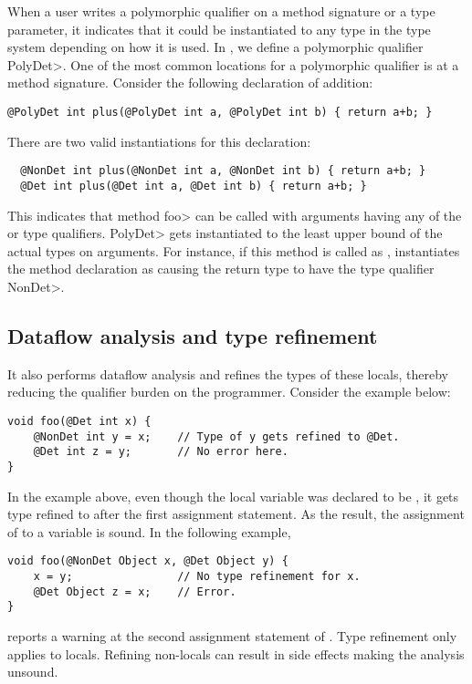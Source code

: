 When a user writes a polymorphic qualifier on a method signature or a type parameter,
it indicates that it could be instantiated
to any type in the type system depending on how it is used.
In \theDeterminismChecker, we define a polymorphic qualifier \<PolyDet>.
One of the most common locations for a polymorphic qualifier is at a method signature.
Consider the following declaration of addition:
\begin{verbatim}
@PolyDet int plus(@PolyDet int a, @PolyDet int b) { return a+b; }
\end{verbatim}
There are two valid instantiations for this declaration:
\begin{Verbatim}
  @NonDet int plus(@NonDet int a, @NonDet int b) { return a+b; }
  @Det int plus(@Det int a, @Det int b) { return a+b; }
\end{Verbatim}
This indicates that method \<foo> can be called with arguments having any of the  or  type qualifiers.
 \<PolyDet> gets instantiated to the least upper bound of
the actual types on arguments. For instance, if this method is called as , \theDeterminismChecker instantiates the method declaration as 
causing the return type to have the type qualifier \<NonDet>.



\subsection{Dataflow analysis and type refinement}\label{sec:dataflow-java}


It also performs dataflow analysis and refines the types of these locals, thereby reducing the qualifier burden 
on the programmer. Consider the example below:
\begin{verbatim}
void foo(@Det int x) {
    @NonDet int y = x;    // Type of y gets refined to @Det.
    @Det int z = y;       // No error here.
}
\end{verbatim}
In the example above, even though the local variable  was declared to be , it gets
type refined to  after the first assignment statement. As the result, the assignment of 
to a  variable  is sound. In the following example,
\begin{verbatim}
void foo(@NonDet Object x, @Det Object y) {
    x = y;                // No type refinement for x.
    @Det Object z = x;    // Error.
}
\end{verbatim}
\theDeterminismChecker reports a warning at the second assignment statement of . Type refinement only applies to locals. Refining non-locals can result in side effects making the analysis unsound.

